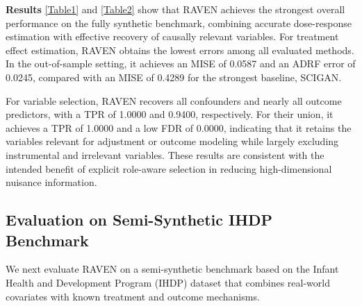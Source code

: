 \documentclass[twoside]{article}
\theoremstyle{plain}
\theoremstyle{definition}
\theoremstyle{remark}
\newtheorem{proof sketch}[theorem]{Proof Sketch}
\begin{document}
\begin{table}[t!]
\centering
\caption{\textbf{(RQ2)} Variable selection on the fully synthetic benchmark.  
We report role-specific FDR and TPR for confounders $c$, outcome predictors $p$, and their union $c \cup p$. 
Results are shown as mean $\pm$ standard deviation over 10 independently generated replicates. }
\label{Table2}

\vspace{1ex}
\end{table}



\textbf{Results}
\cref{Table1} and \cref{Table2} show that RAVEN achieves the strongest overall performance on the fully synthetic benchmark, combining accurate dose-response estimation with effective recovery of causally relevant variables. 
For treatment effect estimation, RAVEN obtains the lowest errors among all evaluated methods. In the out-of-sample setting, it achieves an MISE of 0.0587 and an ADRF error of 0.0245, compared with an MISE of 0.4289 for the strongest baseline, SCIGAN.


For variable selection, RAVEN recovers all confounders and nearly all outcome predictors, with a TPR of 1.0000 and 0.9400, respectively. 
For their union, it achieves a TPR of 1.0000 and a low FDR of 0.0000, indicating that it retains the variables relevant for adjustment or outcome modeling while largely excluding instrumental and irrelevant variables. These results are consistent with the intended benefit of explicit role-aware selection in reducing high-dimensional nuisance information.

\subsection{Evaluation on Semi-Synthetic IHDP Benchmark}
\label{Exp: semi-synthetic}
We next evaluate RAVEN on a semi-synthetic benchmark based on the Infant Health and Development Program (IHDP) dataset that combines real-world covariates with known treatment and outcome mechanisms. 
\end{document}

